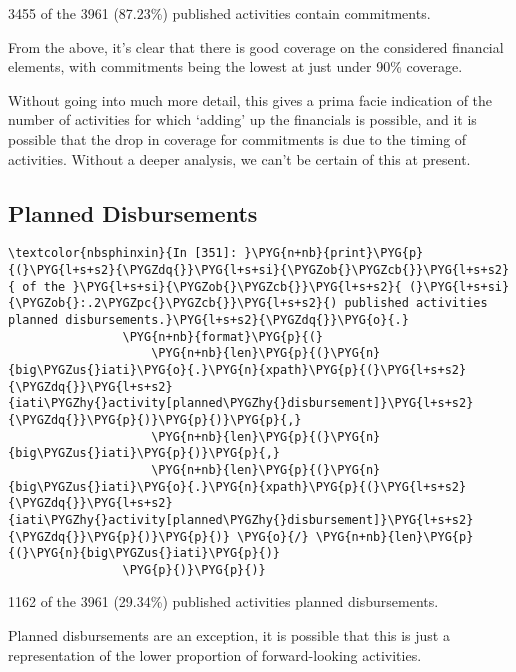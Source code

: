 \documentclass[letterpaper,10pt,english]{sphinxmanual}
\begin{document}
%
\begin{OriginalVerbatim}[commandchars=\\\{\}]
3455 of the 3961 (87.23\%) published activities contain commitments.
\end{OriginalVerbatim}
\relax
From the above, it's clear that there is good coverage on the considered
financial elements, with commitments being the lowest at just under 90\%
coverage.

Without going into much more detail, this gives a prima facie indication
of the number of activities for which `adding' up the financials is
possible, and it is possible that the drop in coverage for commitments
is due to the timing of activities. Without a deeper analysis, we can't
be certain of this at present.


\subsection{Planned Disbursements}
\label{\detokenize{Global Affairs Canada - Compliance Report:Planned-Disbursements}}
\begin{Verbatim}[commandchars=\\\{\}]
\textcolor{nbsphinxin}{In [351]: }\PYG{n+nb}{print}\PYG{p}{(}\PYG{l+s+s2}{\PYGZdq{}}\PYG{l+s+si}{\PYGZob{}\PYGZcb{}}\PYG{l+s+s2}{ of the }\PYG{l+s+si}{\PYGZob{}\PYGZcb{}}\PYG{l+s+s2}{ (}\PYG{l+s+si}{\PYGZob{}:.2\PYGZpc{}\PYGZcb{}}\PYG{l+s+s2}{) published activities planned disbursements.}\PYG{l+s+s2}{\PYGZdq{}}\PYG{o}{.}
                \PYG{n+nb}{format}\PYG{p}{(}
                    \PYG{n+nb}{len}\PYG{p}{(}\PYG{n}{big\PYGZus{}iati}\PYG{o}{.}\PYG{n}{xpath}\PYG{p}{(}\PYG{l+s+s2}{\PYGZdq{}}\PYG{l+s+s2}{iati\PYGZhy{}activity[planned\PYGZhy{}disbursement]}\PYG{l+s+s2}{\PYGZdq{}}\PYG{p}{)}\PYG{p}{)}\PYG{p}{,}
                    \PYG{n+nb}{len}\PYG{p}{(}\PYG{n}{big\PYGZus{}iati}\PYG{p}{)}\PYG{p}{,}
                    \PYG{n+nb}{len}\PYG{p}{(}\PYG{n}{big\PYGZus{}iati}\PYG{o}{.}\PYG{n}{xpath}\PYG{p}{(}\PYG{l+s+s2}{\PYGZdq{}}\PYG{l+s+s2}{iati\PYGZhy{}activity[planned\PYGZhy{}disbursement]}\PYG{l+s+s2}{\PYGZdq{}}\PYG{p}{)}\PYG{p}{)} \PYG{o}{/} \PYG{n+nb}{len}\PYG{p}{(}\PYG{n}{big\PYGZus{}iati}\PYG{p}{)}
                \PYG{p}{)}\PYG{p}{)}
\end{Verbatim}
%
\begin{OriginalVerbatim}[commandchars=\\\{\}]
1162 of the 3961 (29.34\%) published activities planned disbursements.
\end{OriginalVerbatim}
\relax
Planned disbursements are an exception, it is possible that this is just
a representation of the lower proportion of forward-looking activities.
\end{document}
